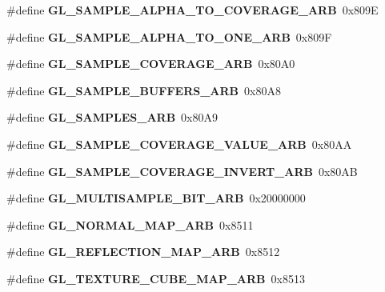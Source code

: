 \begin{DoxyCompactItemize}
\item 
\#define {\bfseries G\+L\+\_\+\+S\+A\+M\+P\+L\+E\+\_\+\+A\+L\+P\+H\+A\+\_\+\+T\+O\+\_\+\+C\+O\+V\+E\+R\+A\+G\+E\+\_\+\+A\+R\+B}~0x809\+E\label{_s_d_l__opengl_8h_a411891855dda47a37df1ef2bd80c182d}

\item 
\#define {\bfseries G\+L\+\_\+\+S\+A\+M\+P\+L\+E\+\_\+\+A\+L\+P\+H\+A\+\_\+\+T\+O\+\_\+\+O\+N\+E\+\_\+\+A\+R\+B}~0x809\+F\label{_s_d_l__opengl_8h_a68cab153252536e5d373c43e9011905a}

\item 
\#define {\bfseries G\+L\+\_\+\+S\+A\+M\+P\+L\+E\+\_\+\+C\+O\+V\+E\+R\+A\+G\+E\+\_\+\+A\+R\+B}~0x80\+A0\label{_s_d_l__opengl_8h_a5a19e0c54d728ef235db1234bb6d70d1}

\item 
\#define {\bfseries G\+L\+\_\+\+S\+A\+M\+P\+L\+E\+\_\+\+B\+U\+F\+F\+E\+R\+S\+\_\+\+A\+R\+B}~0x80\+A8\label{_s_d_l__opengl_8h_a0726922ffc8dd007fbfae5e400330d29}

\item 
\#define {\bfseries G\+L\+\_\+\+S\+A\+M\+P\+L\+E\+S\+\_\+\+A\+R\+B}~0x80\+A9\label{_s_d_l__opengl_8h_a0748808632631e1761050633fe027eb6}

\item 
\#define {\bfseries G\+L\+\_\+\+S\+A\+M\+P\+L\+E\+\_\+\+C\+O\+V\+E\+R\+A\+G\+E\+\_\+\+V\+A\+L\+U\+E\+\_\+\+A\+R\+B}~0x80\+A\+A\label{_s_d_l__opengl_8h_ac1c034894bceb837ffbc15285d2b45ad}

\item 
\#define {\bfseries G\+L\+\_\+\+S\+A\+M\+P\+L\+E\+\_\+\+C\+O\+V\+E\+R\+A\+G\+E\+\_\+\+I\+N\+V\+E\+R\+T\+\_\+\+A\+R\+B}~0x80\+A\+B\label{_s_d_l__opengl_8h_a6bc0ecf9fe4f00a1782245b3c77e93ba}

\item 
\#define {\bfseries G\+L\+\_\+\+M\+U\+L\+T\+I\+S\+A\+M\+P\+L\+E\+\_\+\+B\+I\+T\+\_\+\+A\+R\+B}~0x20000000\label{_s_d_l__opengl_8h_ab1799cb8508f761c98608853fea4d7c6}

\item 
\#define {\bfseries G\+L\+\_\+\+N\+O\+R\+M\+A\+L\+\_\+\+M\+A\+P\+\_\+\+A\+R\+B}~0x8511\label{_s_d_l__opengl_8h_ab57a8cb4825feb2d22b5ae3fd9d55f58}

\item 
\#define {\bfseries G\+L\+\_\+\+R\+E\+F\+L\+E\+C\+T\+I\+O\+N\+\_\+\+M\+A\+P\+\_\+\+A\+R\+B}~0x8512\label{_s_d_l__opengl_8h_adc6c44e58bdb9530731c3bdde5c57b10}

\item 
\#define {\bfseries G\+L\+\_\+\+T\+E\+X\+T\+U\+R\+E\+\_\+\+C\+U\+B\+E\+\_\+\+M\+A\+P\+\_\+\+A\+R\+B}~0x8513\label{_s_d_l__opengl_8h_a6345477179677cbc9d23149a0c2338ca}


\end{DoxyCompactItemize}
